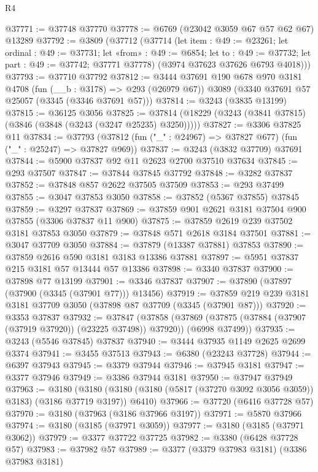\begin{lexlean}{R4}
\begin{coremodule}
@37771 := @37748 @37770
@37778 := @6769 (@23042 @3059 @67 @57 @62 @67) @13289
@37792 := @3809
    (@37712
      (@37714
        (let item : @49 := @23261;
        let ordinal : @49 := @37731;
        let «from» : @49 := @6854; let to : @49 := @37732; let part : @49 := @37742; @37771 @37778)
        (@3974 @37623 @37626 @6793 @4018)))
@37793 := @37710 @37792
@37812 := @3444
    @37691
    @190
    @678
    @970
    @3181
    @4708
    (fun (__b : @3178) => @293 (@26979 @67))
    @3089
    (@3340 @37691 @57 @25057 (@3345 (@3346 @37691 @57)))
@37814 := @3243 (@3835 @13199)
@37815 := @36125 @3056
@37825 := @37814 (@18229 (@3243 (@3841 @37815) (@3846 (@3848 (@3243 (@3247 @25235) @3250)))))
@37827 := @3306 @37825 @11
@37834 := @37793 (@37812 (fun ("_" : @24967) => @37827 @677) (fun ("_" : @25247) => @37827 @969))
@37837 := @3243 (@3832 @37709) @37691
@37844 := @5900 @37837 @92 @11 @2623 @2700 @37510 @37634
@37845 := @293 @37507
@37847 := @37844 @37845 @37792
@37848 := @3282 @37837
@37852 := @37848 @857 @2622 @37505 @37509
@37853 := @293 @37499
@37855 := @3047 @37853 @3050
@37858 := @37852 (@5367 @37855) @37845
@37859 := @3297 @37837
@37869 := @37859 @901 @2621 @3181 @37504 @900 @37855 (@3306 @37837 @11 @900)
@37875 := @37859 @2619 @239 @37502 @3181 @37853 @3050
@37879 := @37848 @571 @2618 @3184 @37501
@37881 := @3047 @37709 @3050
@37884 := @37879 (@13387 @37881) @37853
@37890 := @37859 @2616 @590 @3181 @3183 @13386 @37881
@37897 := @5951 @37837 @215 @3181 @57 @13444 @57 @13386
@37898 := @3340 @37837
@37900 := @37898 @77 @13199
@37901 := @3346 @37837
@37907 := @37890 (@37897 (@37900 (@3345 (@37901 @77))) @13456)
@37919 := @37859 @219 @239 @3181 @3181 @37709 @3050 (@37898 @87 @37709 (@3345 (@37901 @87)))
@37920 := @3353 @37837
@37932 := @37847
    (@37858
      (@37869 (@37875 (@37884 (@37907 (@37919 @37920)) (@23225 @37498)) @37920))
      (@6998 @37499))
@37935 := @3243 (@5546 @37845) @37837
@37940 := @3444 @37935 @1149 @2625 @2699 @3374
@37941 := @3455 @37513
@37943 := @6380 (@23243 @37728)
@37944 := @6397 @37943
@37945 := @3379 @37944
@37946 := @37945 @3181
@37947 := @3377 @37946
@37949 := @3386 @37944 @3181
@37950 := @37947 @37949
@37963 := @3180
    (@3180 (@3180 (@3180 (@5817 (@37270 @3092 @3056 @3059)) @3183) (@3186 @37719 @3197)) @6410)
@37966 := @37720 (@6416 @37728 @57)
@37970 := @3180 (@37963 (@3186 @37966 @3197))
@37971 := @5870 @37966
@37974 := @3180 (@3185 (@37971 @3059))
@37977 := @3180 (@3185 (@37971 @3062))
@37979 := @3377 @37722 @37725
@37982 := @3380 (@6428 @37728 @57)
@37983 := @37982 @57
@37989 := @3377 (@3379 @37983 @3181) (@3386 @37983 @3181)

\end{coremodule}
\end{lexlean}
